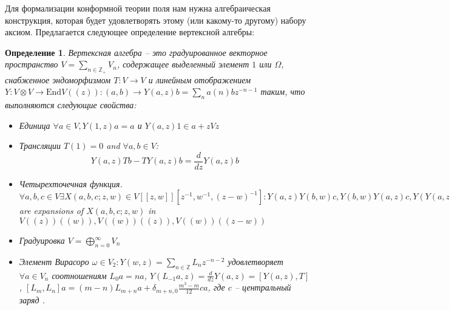 \documentclass[12pt]{article}
\newtheorem{Def}{Определение}[section]
\newtheorem{axiom}{Аксиома}
\begin{document}
Для формализации конформной теории поля нам нужна алгебраическая конструкция, которая будет
удовлетворять этому (или какому-то другому) набору аксиом. Предлагается следующее определение
вертексной алгебры:

\begin{Def}
  Вертексная алгебра -- это градуированное векторное пространство
  $V=\sum_{n\in \mathbb{Z}_{+}} V_{n}$, содержащее выделенный элемент
  $1$ или  $\Omega$, снабженное эндоморфизмом $T:V\to V$ и линейным отображением
  $Y:V\otimes V\to \mathrm{End}V((z)): (a,b)\to Y(a,z)b=\sum_n a (n) b
  z^{-n-1}$ таким, что выполняются следующие свойства:
  \begin{itemize}
  \item {\it Единица} $\forall a\in V, Y(1,z) a =a$ и $Y(a,z) 1 \in a+z V z$
  \item {\it Трансляции} $T(1)=0$ and $\forall a,b\in V$:
    $$Y(a,z)T b - T Y(a,z) b =
    \frac{d}{dz} Y(a,z) b$$
  \item {\it Четырехточечная функция}. $\forall a,b,c\in V \exists
    X(a,b,c;z,w)\in V[[z,w]][z^{-1},w^{-1},(z-w)^{-1}]: Y(a,z)Y(b,w)c,
    Y(b,w)Y(a,z)c, Y(Y(a,z-w)b,w)c$ are expansions of $X(a,b,c;z,w)$
    in $V((z))((w)), V((w))((z)), V((w))((z-w))$
  \item {\it Градуировка} $V=\bigoplus_{n=0}^{\infty} V_n$
  \item {\it Элемент Вирасоро} $\omega\in V_2: Y(w,z)=\sum_{n\in
      \mathbb{Z}} L_n z^{-n-2}$ удовлетворяет $\forall a\in V_n$
    соотношениям $L_0 a =n a$,
    $Y(L_{-1}a,z)=\frac{d}{dz}Y(a,z)=[Y(a,z),T]$,
    $[L_m,L_n]a=(m-n)L_{m+n} a + \delta_{m+n,0} \frac{m^3 - m}{12}ca$,
    где $c$ -- центральный заряд .
  \end{itemize}

\end{Def}
\end{document}

